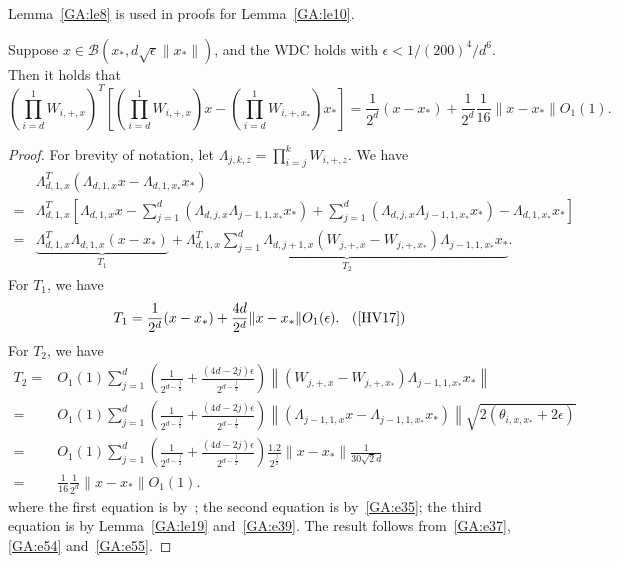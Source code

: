 Lemma~\ref{GA:le8} is used in proofs for Lemma~\ref{GA:le10}.

\begin{lemma}\label{GA:le8}
Suppose $x \in \mathcal{B}(x_*, d \sqrt{\epsilon} \|x_*\|)$, and
the WDC
holds with $\epsilon < 1/ (200)^4 / d^6$.  Then it holds that
\begin{equation*}
\left(\prod_{i = d}^1 W_{i, +, x}\right)^T\left[\left(\prod_{i = d}^1 W_{i, +, x}\right) x - \left(\prod_{i = d}^1 W_{i, +, x_*}\right) x_*\right] = \frac{1}{2^d} (x - x_*) + \frac{1}{2^d} \frac{1}{16} \|x - x_*\| O_1(1).
\end{equation*}
\end{lemma}
\begin{proof}
For brevity of notation, let $\Lambda_{j, k, z} = \prod_{i = j}^k W_{i, +, z}$.
We have
\begin{align}
&\Lambda_{d, 1, x}^T\left(\Lambda_{d, 1, x} x - \Lambda_{d, 1, x_*} x_*\right) \nonumber \\
=& \Lambda_{d, 1, x}^T\left[\Lambda_{d, 1, x} x - \sum_{j = 1}^d \left(\Lambda_{d, j, x} \Lambda_{j-1, 1, x_*} x_*\right)\right. + \left.\sum_{j = 1}^d \left(\Lambda_{d, j, x} \Lambda_{j-1, 1, x_*} x_*\right) - \Lambda_{d, 1, x_*} x_*\right] \nonumber \\
=& \underbrace{\Lambda_{d, 1, x}^T \Lambda_{d, 1, x} (x - x_*)}_{T_1} + \underbrace{\Lambda_{d, 1, x}^T \sum_{j = 1}^d \Lambda_{d, j + 1, x} \left( W_{j, +, x} - W_{j, +, x_*} \right) \Lambda_{j-1, 1, x_*} x_*}_{T_2}. \label{GA:e37}
\end{align}
For $T_1$, we have
\begin{align} \label{GA:e54}
T_1 = \frac{1}{2^d} (x - x_*) + \frac{4 d} {2^d} \|x - x_*\| O_1(\epsilon). \;\; \hbox{ (\cite[(10)]{HV17})}
\end{align}
For $T_2$, we have
\begin{align}
T_2 =& O_1(1) \sum_{j = 1}^d \left( \frac{1}{2^{d - \frac{j}{2}}} + \frac{(4d - 2j)\epsilon}{2^{d - \frac{j}{2}}} \right) \left\|(W_{j, +, x} - W_{j, +, x_*}) \Lambda_{j-1, 1, x_*}x_* \right\| \nonumber \\
=& O_1(1) \sum_{j = 1}^d \left( \frac{1}{2^{d - \frac{j}{2}}} + \frac{(4d - 2j)\epsilon}{2^{d - \frac{j}{2}}} \right) \left\|(\Lambda_{j-1, 1, x} x - \Lambda_{j-1, 1, x_*} x_*) \right\| \sqrt{2 (\theta_{i, x, x_*} + 2 \epsilon)} \nonumber \\
=& O_1(1) \sum_{j = 1}^d \left( \frac{1}{2^{d - \frac{j}{2}}} + \frac{(4d - 2j)\epsilon}{2^{d - \frac{j}{2}}} \right) \frac{1.2}{2^{\frac{j}{2}}} \|x - x_*\| \frac{1}{ 30 \sqrt{2} d} \nonumber \\
=& \frac{1}{16} \frac{1}{2^d} \|x - x_*\| O_1(1). \label{GA:e55}
\end{align}
where the first equation is by~\cite[(10)]{HV17}; the second equation is by~\eqref{GA:e35}; the third equation is by Lemma~\ref{GA:le19} and~\eqref{GA:e39}. The result follows from~\eqref{GA:e37}, \eqref{GA:e54} and~\eqref{GA:e55}.
\end{proof}





